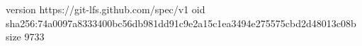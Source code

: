 version https://git-lfs.github.com/spec/v1
oid sha256:74a0097a8333400bc56db981dd91c9e2a15c1ea3494e275575cbd2d48013c08b
size 9733
